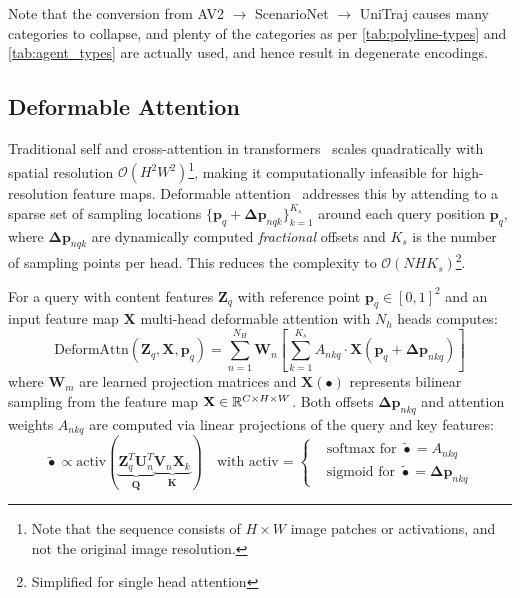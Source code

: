 Note that the conversion from AV2 \( \rightarrow \) ScenarioNet \( \rightarrow \) UniTraj causes many categories to collapse, and plenty of the categories as per \autoref{tab:polyline-types} and  \autoref{tab:agent_types} are actually used, and hence result in degenerate encodings.

\subsection{Deformable Attention}
\label{sec:deformable_attention}

Traditional self and cross-attention in transformers~\cite{vaswani2023attention} scales quadratically with spatial resolution \( \mathcal{O}(H^2W^2) \)\footnote{Note that the sequence consists of \(H \times W\) image patches or activations, and not the original image resolution.}, making it computationally infeasible for high-resolution feature maps. Deformable attention~\cite{zhu2021deformabledetr} addresses this by attending to a sparse set of sampling locations \(\{\mathbf{p}_q + \boldsymbol{\Delta p}_{nqk}\}_{k=1}^{K_s}\) around each query position \(\mathbf{p}_q\), where \(\boldsymbol{\Delta p}_{nqk}\) are dynamically computed \emph{fractional} offsets and \(K_s\) is the number of sampling points per head. This reduces the complexity to \(\mathcal{O}(NHK_s)\)\footnote{Simplified for single head attention}.

For a query with content features \(\mathbf{Z}_q\) with reference point \(\mathbf{p}_q \in [0, 1]^2\) and an input feature map \( \mathbf{X} \) multi-head deformable attention with \( N_h \) heads computes:
\begin{equation}
  \label{eq:deformable_attention_general}
  \text{DeformAttn}(\mathbf{Z}_q, \mathbf{X}, \mathbf{p}_q) = \sum_{n=1}^{N_{H}} \mathbf{W}_n \left[ \sum_{k=1}^{K_s} A_{nkq} \cdot \mathbf{X}(\mathbf{p}_q + \boldsymbol{\Delta p}_{nkq}) \right]
\end{equation}
where \(\mathbf{W}_m\) are learned projection matrices and \(\mathbf{X}(\bullet)\) represents bilinear sampling from the feature map \( \mathbf{X} \in \mathbb{R}^{C \times H \times W} \). Both offsets \(\boldsymbol{\Delta p}_{nkq}\) and attention weights \(A_{nkq}\) are computed via linear projections of the query and key features:
\begin{equation}
\label{eq:deformable_attention_offsets}
\tilde{\bullet} \propto \text{activ}(\underbrace{\mathbf{Z}^T_q \mathbf{U}_n^T}_{\mathbf{Q}}\underbrace{\mathbf{V}_n \mathbf{X}_k}_{\mathbf{K}}) \quad \text{with activ} = \begin{cases}
 &\text{softmax} \text{ for }\tilde{\bullet} = A_{nkq} \\
 &\text{sigmoid} \text{ for }\tilde{\bullet} = \boldsymbol{\Delta p}_{nkq}
\end{cases}
\end{equation}

